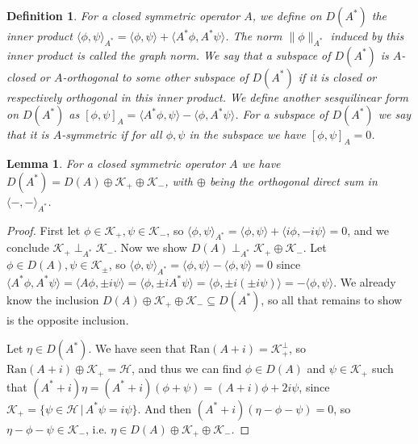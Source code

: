 \documentclass[12pt,oneside]{report}
\newtheorem{lem}[thm]{Lemma}
\newtheorem{defn}[thm]{Definition}
\begin{document}
\begin{defn}
    For a closed symmetric operator $A$, we define on $D(A^{*})$ the inner product $\langle \phi, \psi \rangle_{A^{*}} = \langle \phi, \psi \rangle + \langle A^{*}\phi, A^{*}\psi \rangle$. The norm $\|\phi\|_{A^{*}}$ induced by this inner product is called the graph norm. We say that a subspace of $D(A^{*})$ is $A$-closed or $A$-orthogonal to some other subspace of $D(A^{*})$ if it is closed or respectively orthogonal in this inner product. We define another sesquilinear form on $D(A^{*})$ as $[\phi,\psi]_{A} = \langle A^{*}\phi, \psi \rangle - \langle \phi, A^{*} \psi \rangle$. For a subspace of $D(A^{*})$ we say that it is $A$-symmetric if for all $\phi,\psi$ in the subspace we have $[\phi,\psi]_{A} = 0$.
\end{defn}

\begin{lem}
    For a closed symmetric operator $A$ we have $D(A^{*}) = D(A) \oplus \mathscr{K}_{+} \oplus \mathscr{K}_{-}$, with $\oplus$ being the orthogonal direct sum in $\langle -,- \rangle_{A^{*}}$.
\end{lem}
\begin{proof}
    First let $\phi \in \mathscr{K}_{+}, \psi \in \mathscr{K}_{-}$, so $\langle \phi,\psi \rangle_{A^{*}} = \langle \phi, \psi \rangle + \langle i\phi, -i\psi \rangle = 0$, and we conclude $\mathscr{K}_{+} \perp_{A^{*}} \mathscr{K}_{-}$. Now we show $D(A) \perp_{A^{*}} \mathscr{K}_{+} \oplus \mathscr{K}_{-}$. Let $\phi \in D(A), \psi \in \mathscr{K}_{\pm}$, so $\langle \phi, \psi \rangle_{A^{*}} = \langle \phi,\psi \rangle - \langle \phi,\psi \rangle = 0$ since $\langle A^{*}\phi, A^{*}\psi \rangle = \langle A\phi, \pm i\psi \rangle = \langle \phi, \pm i A^{*}\psi \rangle = \langle \phi, \pm i (\pm i \psi) \rangle = -\langle\phi, \psi \rangle$. We already know the inclusion $D(A) \oplus \mathscr{K}_{+} \oplus \mathscr{K}_{-} \subseteq D(A^{*})$, so all that remains to show is the opposite inclusion.

    Let $\eta \in D(A^{*})$. We have seen that $\text{Ran}(A + i) = \mathscr{K}_{+}^{\perp}$, so $\text{Ran}(A + i) \oplus \mathscr{K}_{+} = \mathscr{H}$, and thus we can find $\phi \in D(A)$ and $\psi \in \mathscr{K}_{+}$ such that $(A^{*}+i)\eta = (A^{*}+i)(\phi + \psi) = (A+i)\phi + 2i\psi$, since $\mathscr{K}_{+} = \{ \psi \in \mathscr{H} \, | \, A^{*}\psi = i \psi \}$. And then $(A^{*} + i)(\eta-\phi-\psi) = 0$, so $\eta - \phi - \psi \in \mathscr{K}_{-}$, i.e. $\eta \in D(A) \oplus \mathscr{K}_{+} \oplus \mathscr{K}_{-}$.
\end{proof}
\end{document}
